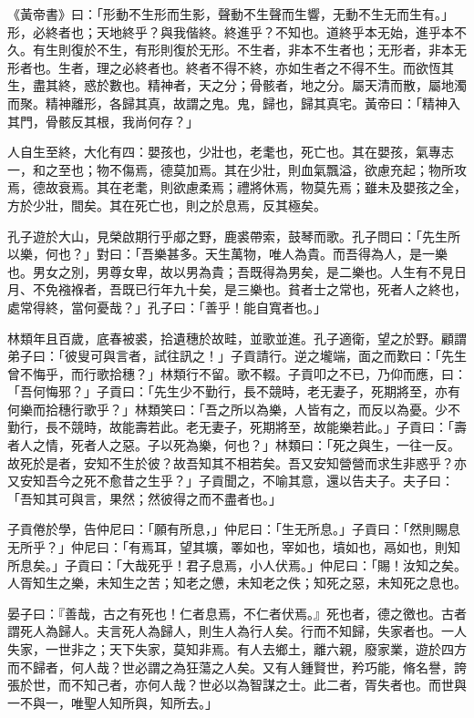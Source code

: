 \begin{pinyinscope}
《黃帝書》曰：「形動不生形而生影，聲動不生聲而生響，无動不生无而生有。」形，必終者也；天地終乎？與我偕終。終進乎？不知也。道終乎本无始，進乎本不久。有生則復於不生，有形則復於无形。不生者，非本不生者也；无形者，非本无形者也。生者，理之必終者也。終者不得不終，亦如生者之不得不生。而欲恆其生，盡其終，惑於數也。精神者，天之分；骨骸者，地之分。屬天清而散，屬地濁而聚。精神離形，各歸其真，故謂之鬼。鬼，歸也，歸其真宅。黃帝曰：「精神入其門，骨骸反其根，我尚何存？」

人自生至終，大化有四：嬰孩也，少壯也，老耄也，死亡也。其在嬰孩，氣專志一，和之至也；物不傷焉，德莫加焉。其在少壯，則血氣飄溢，欲慮充起；物所攻焉，德故衰焉。其在老耄，則欲慮柔焉；禮將休焉，物莫先焉；雖未及嬰孩之全，方於少壯，間矣。其在死亡也，則之於息焉，反其極矣。

孔子遊於大山，見榮啟期行乎郕之野，鹿裘帶索，鼓琴而歌。孔子問曰：「先生所以樂，何也？」對曰：「吾樂甚多。天生萬物，唯人為貴。而吾得為人，是一樂也。男女之別，男尊女卑，故以男為貴；吾既得為男矣，是二樂也。人生有不見日月、不免襁褓者，吾既已行年九十矣，是三樂也。貧者士之常也，死者人之終也，處常得終，當何憂哉？」孔子曰：「善乎！能自寬者也。」

林類年且百歲，底春被裘，拾遺穗於故畦，並歌並進。孔子適衛，望之於野。顧謂弟子曰：「彼叟可與言者，試往訊之！」子貢請行。逆之壠端，面之而歎曰：「先生曾不悔乎，而行歌拾穗？」林類行不留。歌不輟。子貢叩之不已，乃仰而應，曰：「吾何悔邪？」子貢曰：「先生少不勤行，長不競時，老无妻子，死期將至，亦有何樂而拾穗行歌乎？」林類笑曰：「吾之所以為樂，人皆有之，而反以為憂。少不勤行，長不競時，故能壽若此。老无妻子，死期將至，故能樂若此。」子貢曰：「壽者人之情，死者人之惡。子以死為樂，何也？」林類曰：「死之與生，一往一反。故死於是者，安知不生於彼？故吾知其不相若矣。吾又安知營營而求生非惑乎？亦又安知吾今之死不愈昔之生乎？」子貢聞之，不喻其意，還以告夫子。夫子曰：「吾知其可與言，果然；然彼得之而不盡者也。」

子貢倦於學，告仲尼曰：「願有所息，」仲尼曰：「生无所息。」子貢曰：「然則賜息无所乎？」仲尼曰：「有焉耳，望其壙，睪如也，宰如也，墳如也，鬲如也，則知所息矣。」子貢曰：「大哉死乎！君子息焉，小人伏焉。」仲尼曰：「賜！汝知之矣。人胥知生之樂，未知生之苦；知老之憊，未知老之佚；知死之惡，未知死之息也。

晏子曰：『善哉，古之有死也！仁者息焉，不仁者伏焉。』死也者，德之徼也。古者謂死人為歸人。夫言死人為歸人，則生人為行人矣。行而不知歸，失家者也。一人失家，一世非之；天下失家，莫知非焉。有人去鄉土，離六親，廢家業，遊於四方而不歸者，何人哉？世必謂之為狂蕩之人矣。又有人鍾賢世，矜巧能，脩名譽，誇張於世，而不知己者，亦何人哉？世必以為智謀之士。此二者，胥失者也。而世與一不與一，唯聖人知所與，知所去。」


\end{pinyinscope}
